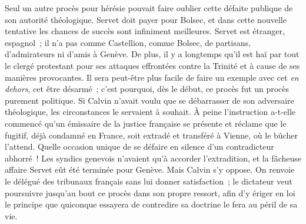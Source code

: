 \documentclass[french,twoside]{book} %
\newcommand{\astermono}{\medskip\centerline{\color{rubric}\large\selectfont{\syms ✻}}\medskip\par}%
\begin{document}
Seul un autre procès pour hérésie pouvait faire oublier cette défaite publique de son autorité théologique. Servet doit payer pour Bolsec, et dans cette nouvelle tentative les chances de succès sont infiniment meilleures. Servet est étranger, espagnol ; il n’a pas comme Castellion, comme Bolsec, de partisans, d’admirateurs ni d’amis à Genève. De plus, il y a longtemps qu’il est haï par tout le clergé protestant pour ses attaques effrontées contre la Trinité et à cause de ses manières provocantes. Il sera peut-être plus facile de faire un exemple avec cet \emph{en dehors}, cet être désarmé ; c’est pourquoi, dès le début, ce procès fut un procès purement politique. Si Calvin n’avait voulu que se débarrasser de son adversaire théologique, les circonstances le servaient à souhait. À peine l’instruction a-t-elle commencé qu’un émissaire de la justice française se présente et réclame que le fugitif, déjà condamné en France, soit extradé et transféré à Vienne, où le bûcher l’attend. Quelle occasion unique de se défaire en silence d’un contradicteur abhorré ! Les syndics genevois n’avaient qu’à accorder l’extradition, et la fâcheuse affaire Servet eût été terminée pour Genève. Mais Calvin s’y oppose. On renvoie le délégué des tribunaux français sans lui donner satisfaction ; le dictateur veut poursuivre jusqu’au bout ce procès dans son propre ressort, afin d’y ériger en loi le principe que quiconque essayera de contredire sa doctrine le fera au péril de sa vie.\par

\astermono
\end{document}
